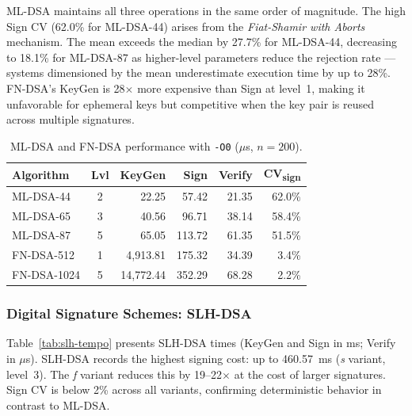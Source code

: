 \documentclass[12pt]{article}
\begin{document}
ML-DSA maintains all three operations in the same order of magnitude. The
high Sign CV (62.0\% for ML-DSA-44) arises from the \textit{Fiat-Shamir
with Aborts} mechanism. The mean exceeds the median by 27.7\% for ML-DSA-44,
decreasing to 18.1\% for ML-DSA-87 as higher-level parameters reduce the
rejection rate --- systems dimensioned by the mean underestimate execution
time by up to 28\%. FN-DSA's KeyGen is 28$\times$ more expensive than Sign
at level~1, making it unfavorable for ephemeral keys but competitive when
the key pair is reused across multiple signatures.

\begin{table}[htbp]
\caption{ML-DSA and FN-DSA performance with \texttt{-O0} ($\mu$s, $n=200$).}
\label{tab:sig-lattice-tempo}
\centering\small
\begin{tabular}{lcrrrr}
\toprule
\textbf{Algorithm} & \textbf{Lvl} & \textbf{KeyGen} & \textbf{Sign} & \textbf{Verify} & \textbf{CV\textsubscript{sign}} \\
\midrule
ML-DSA-44 & 2 &  22.25 &  57.42 & 21.35 & 62.0\% \\
ML-DSA-65 & 3 &  40.56 &  96.71 & 38.14 & 58.4\% \\
ML-DSA-87 & 5 &  65.05 & 113.72 & 61.35 & 51.5\% \\
\midrule
FN-DSA-512  & 1 & 4,913.81 & 175.32 & 34.39 & 3.4\% \\
FN-DSA-1024 & 5 & 14,772.44 & 352.29 & 68.28 & 2.2\% \\
\bottomrule
\end{tabular}
\end{table}

\subsubsection{Digital Signature Schemes: SLH-DSA}
Table~\ref{tab:slh-tempo} presents SLH-DSA times (KeyGen and Sign in ms;
Verify in $\mu$s). SLH-DSA records the highest signing cost: up to
460.57~ms (\textit{s} variant, level~3). The \textit{f} variant reduces
this by 19--22$\times$ at the cost of larger signatures. Sign CV is below
2\% across all variants, confirming deterministic behavior in contrast to
ML-DSA.
\end{document}
